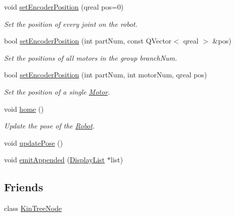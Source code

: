 \begin{DoxyCompactItemize}
void \hyperlink{class_robot_model_1_1_robot_a99dfb27d656fbec65adc1c3881d63f6f}{setEncoderPosition} (qreal pos=0)
\begin{DoxyCompactList}\small\item\em Set the position of every joint on the robot. \item\end{DoxyCompactList}\item 
bool \hyperlink{class_robot_model_1_1_robot_a0d1c835b7a107a1ff6fe36bc9cf0622e}{setEncoderPosition} (int partNum, const QVector$<$ qreal $>$ \&pos)
\begin{DoxyCompactList}\small\item\em Set the positions of all motors in the group branchNum. \item\end{DoxyCompactList}\item 
bool \hyperlink{class_robot_model_1_1_robot_a8e66688b7abcf8cadd86c463c6c97458}{setEncoderPosition} (int partNum, int motorNum, qreal pos)
\begin{DoxyCompactList}\small\item\em Set the position of a single \hyperlink{class_robot_model_1_1_motor}{Motor}. \item\end{DoxyCompactList}\item 
void \hyperlink{class_robot_model_1_1_robot_a6238d22c6617eb9b56dba349851d6119}{home} ()
\begin{DoxyCompactList}\small\item\em Update the pose of the \hyperlink{class_robot_model_1_1_robot}{Robot}. \item\end{DoxyCompactList}\item 
void \hyperlink{class_robot_model_1_1_robot_a7dc3d1bbf0e7f297503a7ed8c89dd63b}{updatePose} ()
\item 
void \hyperlink{class_robot_model_1_1_robot_a4c006ead68b20137a28276920103667c}{emitAppended} (\hyperlink{class_robot_model_1_1_display_list}{DisplayList} $\ast$list)
\end{DoxyCompactItemize}
\subsection*{Friends}
\begin{DoxyCompactItemize}
\item 
class \hyperlink{class_robot_model_1_1_robot_a3dae6d594db374d61cfe7a7701326056}{KinTreeNode}
\end{DoxyCompactItemize}


